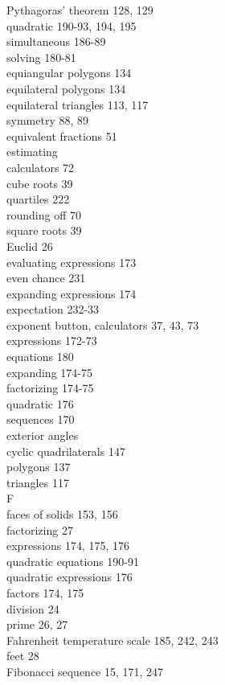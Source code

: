 \documentclass[10pt]{article}
\begin{document}
Pythagoras' theorem 128, 129\\
quadratic 190-93, 194, 195\\
simultaneous 186-89\\
solving 180-81\\
equiangular polygons 134\\
equilateral polygons 134\\
equilateral triangles 113, 117\\
symmetry 88, 89\\
equivalent fractions 51\\
estimating\\
calculators 72\\
cube roots 39\\
quartiles 222\\
rounding off 70\\
square roots 39\\
Euclid 26\\
evaluating expressions 173\\
even chance 231\\
expanding expressions 174\\
expectation 232-33\\
exponent button, calculators 37, 43, 73\\
expressions 172-73\\
equations 180\\
expanding 174-75\\
factorizing 174-75\\
quadratic 176\\
sequences 170\\
exterior angles\\
cyclic quadrilaterals 147\\
polygons 137\\
triangles 117\\
F\\
faces of solids 153, 156\\
factorizing 27\\
expressions 174, 175, 176\\
quadratic equations 190-91\\
quadratic expressions 176\\
factors 174, 175\\
division 24\\
prime 26, 27\\
Fahrenheit temperature scale 185, 242, 243\\
feet 28\\
Fibonacci sequence 15, 171, 247\\
\end{document}
